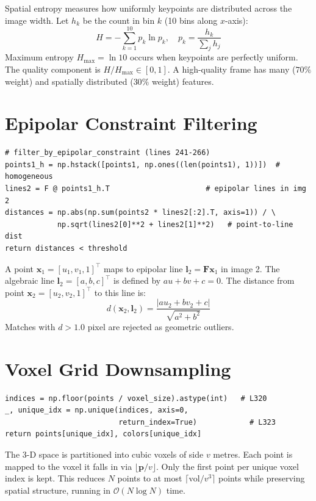 \documentclass[12pt,a4paper,twoside]{report}
\theoremstyle{definition}
\newcommand{\vect}[1]{\bm{#1}}
\newcommand{\mat}[1]{\mathbf{#1}}
\newcommand{\abs}[1]{\left| #1 \right|}
\newcommand{\T}{\top}           %
\begin{document}
\begin{mathbox}
Spatial entropy measures how uniformly keypoints are distributed across the
image width. Let $h_k$ be the count in bin $k$ (10 bins along $x$-axis):
\[
  H = -\sum_{k=1}^{10} p_k \ln p_k, \quad p_k = \frac{h_k}{\sum_j h_j}
\]
Maximum entropy $H_{\max} = \ln 10$ occurs when keypoints are perfectly
uniform. The quality component is $H / H_{\max} \in [0,1]$.
A high-quality frame has many ($70\%$ weight) and spatially distributed
($30\%$ weight) features.
\end{mathbox}

\section{Epipolar Constraint Filtering}

\begin{lstlisting}
# filter_by_epipolar_constraint (lines 241-266)
points1_h = np.hstack([points1, np.ones((len(points1), 1))])  # homogeneous
lines2 = F @ points1_h.T                      # epipolar lines in img 2
distances = np.abs(np.sum(points2 * lines2[:2].T, axis=1)) / \
            np.sqrt(lines2[0]**2 + lines2[1]**2)   # point-to-line dist
return distances < threshold
\end{lstlisting}

\begin{mathbox}
A point $\vect{x}_1 = [u_1,v_1,1]^\T$ maps to epipolar line $\vect{l}_2 = \mat{F}\vect{x}_1$
in image 2. The algebraic line $\vect{l}_2 = [a,b,c]^\T$ is defined by
$au+bv+c=0$. The distance from point $\vect{x}_2=[u_2,v_2,1]^\T$ to this
line is:
\[
  d(\vect{x}_2, \vect{l}_2) = \frac{\abs{a u_2 + b v_2 + c}}{\sqrt{a^2+b^2}}
\]
Matches with $d > 1.0$ pixel are rejected as geometric outliers.
\end{mathbox}

\section{Voxel Grid Downsampling}

\begin{lstlisting}
indices = np.floor(points / voxel_size).astype(int)   # L320
_, unique_idx = np.unique(indices, axis=0,
                          return_index=True)            # L323
return points[unique_idx], colors[unique_idx]
\end{lstlisting}

\begin{defbox}
The 3-D space is partitioned into cubic voxels of side $v$ metres. Each point
is mapped to the voxel it falls in via $\lfloor \vect{p}/v \rfloor$.
Only the first point per unique voxel index is kept. This reduces $N$ points
to at most $\lceil \text{vol}/v^3 \rceil$ points while preserving spatial
structure, running in $\mathcal{O}(N\log N)$ time.
\end{defbox}
\end{document}
